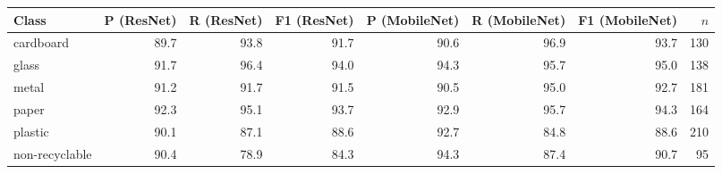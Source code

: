 \begin{tabular}{lrrrrrrr}
\toprule
Class & P (ResNet) & R (ResNet) & F1 (ResNet) & P (MobileNet) & R (MobileNet) & F1 (MobileNet) & $n$ \\
\midrule
cardboard & 89.7 & 93.8 & 91.7 & 90.6 & 96.9 & 93.7 & 130 \\
glass & 91.7 & 96.4 & 94.0 & 94.3 & 95.7 & 95.0 & 138 \\
metal & 91.2 & 91.7 & 91.5 & 90.5 & 95.0 & 92.7 & 181 \\
paper & 92.3 & 95.1 & 93.7 & 92.9 & 95.7 & 94.3 & 164 \\
plastic & 90.1 & 87.1 & 88.6 & 92.7 & 84.8 & 88.6 & 210 \\
non-recyclable & 90.4 & 78.9 & 84.3 & 94.3 & 87.4 & 90.7 & 95 \\
\bottomrule
\end{tabular}
